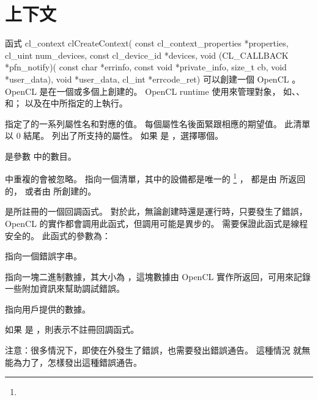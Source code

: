 \section{上下文}
函式
\startCLFUNC
cl_context clCreateContext(
		const cl_context_properties *properties,
		cl_uint num_devices,
		const cl_device_id *devices,
		void (CL_CALLBACK *pfn_notify)(
			const char *errinfo,
			const void *private_info,
			size_t cb,
			void *user_data),
		void *user_data,
		cl_int *errcode_ret)
\stopCLFUNC
可以創建一個 OpenCL 。
OpenCL 是在一個或多個上創建的。
OpenCL runtime 使用來管理對象，
如、、和；
以及在中所指定的上執行。

 指定了的一系列屬性名和對應的值。
每個屬性名後面緊跟相應的期望值。
此清單以 0 結尾。
列出了所支持的屬性。
如果  是 ，選擇哪個。

{}

 是參數  中的數目。

\startbuffer[footnoteuniquedevice]
 中重複的會被忽略。
\stopbuffer
{} 指向一個清單，其中的設備都是唯一的
\footnote{\getbuffer[footnoteuniquedevice]}
，
都是由  所返回的，
或者由  所創建的。

 是所註冊的一個回調函式。
對於此，無論創建時還是運行時，只要發生了錯誤，OpenCL 的實作都會調用此函式，但調用可能是異步的。
需要保證此函式是線程安全的。
此函式的參數為：
\startigBase
\item {} 指向一個錯誤字串。
\item {} 指向一塊二進制數據，其大小為 ，這塊數據由 OpenCL 實作所返回，可用來記錄一些附加資訊來幫助調試錯誤。
\item {} 指向用戶提供的數據。
\stopigBase

如果  是 ，則表示不註冊回調函式。

注意：很多情況下，即使在外發生了錯誤，也需要發出錯誤通告。
這種情況  就無能為力了，怎樣發出這種錯誤通告。

